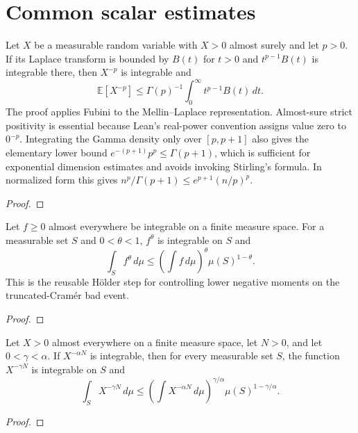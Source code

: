 \chapter{Common scalar estimates}

\begin{lemma}
  \label{lem:laplace-envelope-negative-moment}
  \leanok
  Let $X$ be a measurable random variable with $X>0$ almost surely and let
  $p>0$. If its Laplace transform is bounded by $B(t)$ for $t>0$ and
  $t^{p-1}B(t)$ is integrable there, then $X^{-p}$ is integrable and
  \[
    \mathbb E[X^{-p}]
    \le \Gamma(p)^{-1}\int_0^\infty t^{p-1}B(t)\,dt.
  \]
  The proof applies Fubini to the Mellin--Laplace representation. Almost-sure
  strict positivity is essential because Lean's real-power convention assigns
  value zero to $0^{-p}$. Integrating the Gamma density only over
  $[p,p+1]$ also gives the elementary lower bound
  $e^{-(p+1)}p^p\leq\Gamma(p+1)$, which is sufficient for exponential
  dimension estimates and avoids invoking Stirling's formula. In normalized
  form this gives
  $n^p/\Gamma(p+1)\leq e^{p+1}(n/p)^p$.
\end{lemma}
\begin{proof}\leanok\end{proof}

\begin{lemma}
  \label{lem:set-fractional-moment-holder}
  \leanok
  Let $f\ge0$ almost everywhere be integrable on a finite measure space.
  For a measurable set $S$ and $0<\theta<1$,
  $f^\theta$ is integrable on $S$ and
  \[
    \int_S f^\theta\,d\mu
    \le
    \left(\int f\,d\mu\right)^\theta
    \mu(S)^{1-\theta}.
  \]
  This is the reusable Hölder step for controlling lower negative moments on
  the truncated-Cramér bad event.
\end{lemma}
\begin{proof}\leanok\end{proof}

\begin{lemma}
  \label{lem:set-negative-moment-holder}
  \leanok
  Let $X>0$ almost everywhere on a finite measure space, let $N>0$, and let
  $0<\gamma<\alpha$. If $X^{-\alpha N}$ is integrable, then for every
  measurable set $S$, the function $X^{-\gamma N}$ is integrable on $S$ and
  \[
    \int_S X^{-\gamma N}\,d\mu
    \le
    \left(\int X^{-\alpha N}\,d\mu\right)^{\gamma/\alpha}
    \mu(S)^{1-\gamma/\alpha}.
  \]
\end{lemma}
\begin{proof}\leanok\end{proof}

